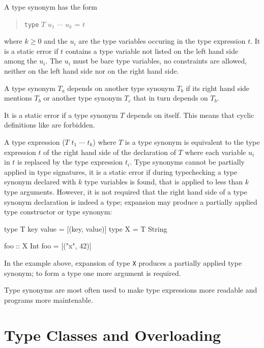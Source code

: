 \begin{flushleft}
    \sym{=} 
\end{flushleft}

A type synonym has the form
\begin{quote}
\texttt{type} $T$ $u_1$ $\cdots$ $u_k$ = $t$
\end{quote}
where $k\ge 0$ and the $u_i$ are the type variables occuring in the type expression $t$. It is a static error if $t$ contains a type variable not listed on the left hand side among the $u_i$. The $u_i$ must be bare type variables, no constraints are allowed, neither on the left hand side nor on the right hand side.

A type synonym $T_a$ depends on another type synonym $T_b$ if its right hand side mentions $T_b$ or another type synonym $T_c$ that in turn depends on $T_b$.

It is a static error if a type synonym $T$ depends on itself.
This means that cyclic definitions like 
are forbidden.

A type expression ($T$ $t_1$ $\cdots$ $t_k$) where $T$ is a type synonym is equivalent to the type expression $t$ of the right hand side of the declaration of $T$ where each variable $u_i$ in $t$ is replaced by the type expression $t_i$. Type synonyms cannot be partially applied in type signatures, it is a static error if during typechecking a type synonym declared with $k$ type variables is found, that is applied to less than $k$ type arguments. However, it is not required that the right hand side of a type synonym declaration is indeed a type; expansion may produce a partially applied type constructor or type synonym:

\begin{code}
type T key value = [(key, value)]
type X = T String

foo :: X Int
foo = [("x", 42)]
\end{code}

In the example above, expansion of type \texttt{X} produces a partially applied type synonym; to form a type one more argument is required.

Type synonyms are most often used to make type expressions more readable and programs more maintenable.

\section{Type Classes and Overloading}
